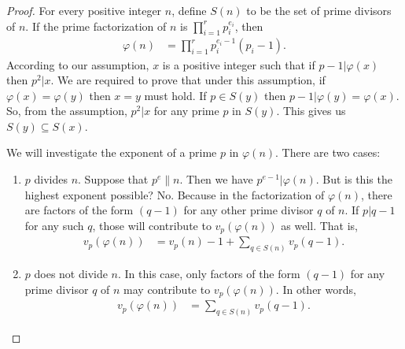 \documentclass{subfile}
\begin{document}
		\begin{proof}
			For every positive integer $n$, define $S(n)$ to be the set of prime divisors of $n$. If the prime factorization of $n$ is $\prod_{i=1}^{r}p_i^{e_i}$, then
				\begin{align*}
					\varphi(n) & = \prod_{i=1}^{r}p_i^{e_i-1}(p_i-1).
				\end{align*}
			According to our assumption, $x$ is a positive integer such that if $p-1|\varphi(x)$ then $p^2|x$. We are required to prove that under this assumption, if $\varphi(x)=\varphi(y)$ then $x=y$ must hold. If $p\in S(y)$ then $p-1|\varphi(y)=\varphi(x)$. So, from the assumption, $p^2|x$ for any prime $p$ in $S(y)$. This gives us $S(y)\subseteq S(x)$.
				
			We will investigate the exponent of a prime $p$ in $\varphi(n)$. There are two cases:
				\begin{enumerate}
					\item $p$ divides $n$. Suppose that $p^e\|n$. Then we have $p^{e-1}|\varphi(n)$. But is this the highest exponent possible? No. Because in the factorization of $\varphi(n)$, there are factors of the form $(q-1)$ for any other prime divisor $q$ of $n$. If $p|q-1$ for any such $q$, those will contribute to $v_p(\varphi(n))$ as well. That is,
						\begin{align*}
							v_p(\varphi(n)) & = v_p(n)-1+\sum_{q\in S(n)}v_p(q-1).
						\end{align*}
					
					\item $p$ does not divide $n$. In this case, only factors of the form $(q-1)$ for any prime divisor $q$ of $n$ may contribute to $v_p(\varphi(n))$. In other words,
						\begin{align*}
							v_p(\varphi(n)) & = \sum_{q\in S(n)}v_p(q-1).
						\end{align*}
				\end{enumerate}


\end{proof}
\end{document}
